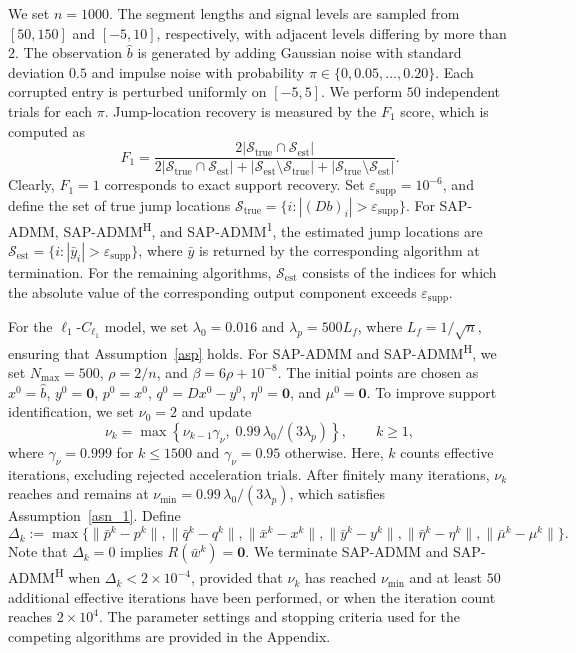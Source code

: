 We set \(n=1000\). The segment lengths and signal levels are sampled from \([50,150]\) and \([-5,10]\), respectively, with adjacent levels differing by more than \(2\). The observation \(\hat b\) is generated by adding Gaussian noise with standard deviation \(0.5\) and impulse noise with probability \(\pi \in \{0,0.05,\ldots,0.20\}\). Each corrupted entry is perturbed uniformly on \([-5,5]\). We perform $50$ independent trials for each $\pi$.
Jump-location recovery is measured by the $F_1$ score, which is computed as
\[
F_1
=
\frac{
2|\mathcal{S}_{\mathrm{true}}\cap\mathcal{S}_{\mathrm{est}}|
}{
2|\mathcal{S}_{\mathrm{true}}\cap\mathcal{S}_{\mathrm{est}}|
+
|\mathcal{S}_{\mathrm{est}}\setminus\mathcal{S}_{\mathrm{true}}|
+
|\mathcal{S}_{\mathrm{true}}\setminus\mathcal{S}_{\mathrm{est}}|
}.
\]
Clearly, $F_1=1$ corresponds to exact support recovery.
Set
\(\varepsilon_{\mathrm{supp}}=10^{-6}\), and define the set of true jump locations \(\mathcal{S}_{\mathrm{true}}
=\bigl\{i:|(Db)_i|>\varepsilon_{\mathrm{supp}}\bigr\}\). For SAP-ADMM, SAP-ADMM\textsuperscript{H}, and
SAP-ADMM\textsuperscript{1}, the estimated jump locations are
\(\mathcal{S}_{\mathrm{est}}
=\{i:|\bar y_i|>\varepsilon_{\mathrm{supp}}\}\),
where \(\bar y\) is returned by the corresponding algorithm
at termination.
For the remaining algorithms, \(\mathcal{S}_{\mathrm{est}}\)
consists of the indices for which the absolute value of the
corresponding output component exceeds
\(\varepsilon_{\mathrm{supp}}\).

For the \(\ell_1\)-\(C_{\ell_1}\) model, we set
\(\lambda_0=0.016\) and \(\lambda_p=500L_f\), where
\(L_f=1/\sqrt{n}\), ensuring that Assumption~\ref{asp} holds.
For SAP-ADMM and SAP-ADMM\textsuperscript{H}, we set
\(N_{\mathrm{max}}=500\), \(\rho=2/n\), and
\(\beta=6\rho+10^{-8}\).
The initial points are chosen as \(x^0=\hat b\),
\(y^0=\mathbf{0}\), \(p^0=x^0\), \(q^0=Dx^0-y^0\),
\(\eta^0=\mathbf{0}\), and \(\mu^0=\mathbf{0}\).
To improve support identification, we set \(\nu_0=2\) and update
\[
\nu_k
=\max\left\{
\nu_{k-1}\gamma_\nu,\;
0.99\,\lambda_0/(3\lambda_p)
\right\},
\qquad k\geq1,
\]
where \(\gamma_\nu=0.999\) for \(k\leq1500\) and
\(\gamma_\nu=0.95\) otherwise. Here, \(k\) counts effective
iterations, excluding rejected acceleration trials.
After finitely many iterations, \(\nu_k\) reaches and remains
at \(\nu_{\min}=0.99\,\lambda_0/(3\lambda_p)\), which satisfies
Assumption~\ref{asn_1}.
Define
\[
\Delta_k
:=
\max\bigl\{
\|\bar p^k-p^k\|,
\|\bar q^k-q^k\|,
\|\bar x^k-x^k\|,
\|\bar y^k-y^k\|,
\|\bar\eta^k-\eta^k\|,
\|\bar\mu^k-\mu^k\|
\bigr\}.
\]
{\color{blue}
Note that $\Delta_k=0$ implies $R(\bar w^k)=\mathbf{0}$.}
We terminate SAP-ADMM and SAP-ADMM\textsuperscript{H} when
\(\Delta_k<2\times10^{-4}\), provided that \(\nu_k\) has reached
\(\nu_{\min}\) and at least \(50\) additional effective iterations
have been performed, or when the iteration count reaches
\(2\times10^4\).
The parameter settings and stopping criteria used for the
competing algorithms are provided in the Appendix.
 
